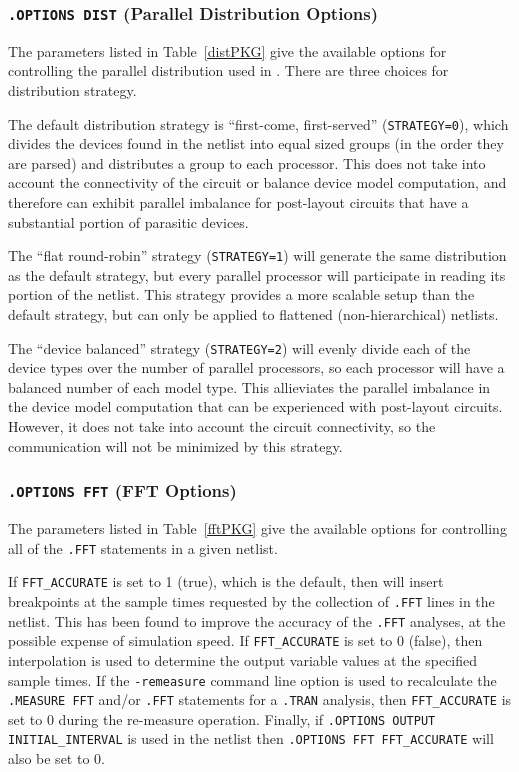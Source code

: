 

\subsubsection{\texttt{.OPTIONS DIST} (Parallel Distribution Options)}

The parameters listed in Table~\ref{distPKG} give the available
options for controlling the parallel distribution used in \Xyce{}.
There are three choices for distribution strategy.

The default distribution strategy is ``first-come, first-served''
(\texttt{STRATEGY=0}), which divides the devices found in the netlist
into equal sized groups (in the order they are parsed) and distributes
a group to each processor.  This does not take into account the
connectivity of the circuit or balance device model computation, and
therefore can exhibit parallel imbalance for post-layout circuits that
have a substantial portion of parasitic devices.

The ``flat round-robin'' strategy (\texttt{STRATEGY=1}) will generate
the same distribution as the default strategy, but every parallel
processor will participate in reading its portion of the netlist.
This strategy provides a more scalable setup than the default
strategy, but can only be applied to flattened (non-hierarchical)
netlists.

The ``device balanced'' strategy (\texttt{STRATEGY=2}) will evenly
divide each of the device types over the number of parallel
processors, so each processor will have a balanced number of each
model type.  This allieviates the parallel imbalance in the device
model computation that can be experienced with post-layout circuits.
However, it does not take into account the circuit connectivity, so
the communication will not be minimized by this strategy.



\subsubsection{\texttt{.OPTIONS FFT} (FFT Options)}
The parameters listed in Table~\ref{fftPKG} give the available
options for controlling all of the \texttt{.FFT} statements in
a given \Xyce{} netlist.

If \texttt{FFT\_ACCURATE} is set to 1 (true), which is the default, then
\Xyce{} will insert breakpoints at the sample times requested by the
collection of \texttt{.FFT} lines in the netlist.  This has been found
to improve the accuracy of the \texttt{.FFT} analyses, at the possible
expense of simulation speed.  If \texttt{FFT\_ACCURATE} is set to
0 (false), then interpolation is used to determine the output variable
values at the specified sample times.  If the \texttt{-remeasure} command
line option is used to recalculate the \texttt{.MEASURE FFT} and/or
\texttt{.FFT} statements for a \texttt{.TRAN} analysis, then
\texttt{FFT\_ACCURATE} is set to 0 during the re-measure operation.  Finally,
if \texttt{.OPTIONS OUTPUT INITIAL\_INTERVAL} is used in the netlist
then \texttt{.OPTIONS FFT FFT\_ACCURATE} will also be set to 0.

